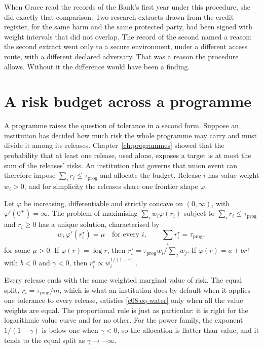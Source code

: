 When Grace read the records of the Bank's first year under this procedure, she did
exactly that comparison. Two research extracts drawn from the credit register, for
the same harm and the same protected party, had been signed with weight intervals
that did not overlap. The record of the second named a reason: the second extract
went only to a secure environment, under a different access route, with a different
declared adversary. That was a reason the procedure allows. Without it the
difference would have been a finding.

\section{A risk budget across a programme}\label{c08:sec-budget}

A programme raises the question of tolerance in a second form. Suppose an
institution has decided how much risk the whole programme may carry and must divide
it among its releases. Chapter~\ref{ch:programmes} showed that the probability that
at least one release, used alone, exposes a target is at most the sum of the
releases' risks. An institution that governs that union event can therefore impose
$\sum_i r_i \le \tau_{\mathrm{prog}}$ and allocate the budget. Release $i$ has value
weight $w_i > 0$, and for simplicity the releases share one frontier shape
$\varphi$.

\begin{proposition}\label{c08:prop-budget}
Let $\varphi$ be increasing, differentiable and strictly concave on $(0,\infty)$,
with $\varphi'(0^+) = \infty$. The problem of maximising $\sum_i w_i \varphi(r_i)$
subject to $\sum_i r_i \le \tau_{\mathrm{prog}}$ and $r_i \ge 0$ has a unique
solution, characterised by
\begin{equation}\label{c08:eq-water}
w_i\,\varphi'(r_i^\star) = \mu \quad \text{for every } i, \qquad
\sum_i r_i^\star = \tau_{\mathrm{prog}},
\end{equation}
for some $\mu > 0$. If $\varphi(r) = \log r$, then $r_i^\star = \tau_{\mathrm{prog}}
w_i / \sum_j w_j$. If $\varphi(r) = a + b r^{\gamma}$ with $b < 0$ and $\gamma < 0$,
then $r_i^\star \propto w_i^{1/(1-\gamma)}$.
\end{proposition}

Every release ends with the same weighted marginal value of risk. The equal split,
$r_i = \tau_{\mathrm{prog}}/m$, which is what an institution does by default when it
applies one tolerance to every release, satisfies \eqref{c08:eq-water} only when all
the value weights are equal. The proportional rule is just as particular: it is
right for the logarithmic value curve and for no other. For the power family, the
exponent $1/(1-\gamma)$ is below one when $\gamma < 0$, so the allocation is flatter
than value, and it tends to the equal split as $\gamma \to -\infty$.

